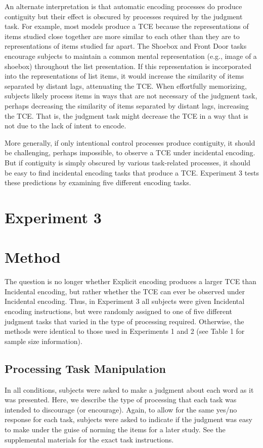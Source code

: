 \documentclass[man,natbib,floatsintext]{apa6} %
\begin{document}
An alternate interpretation is that automatic encoding processes do produce contiguity but their effect is obscured by processes required by the judgment task. For example, most models produce a TCE because the representations of items studied close together are more similar to each other than they are to representations of items studied far apart. The Shoebox and Front Door tasks encourage subjects to maintain a common mental representation (e.g., image of a shoebox) throughout the list presentation. If this representation is incorporated into the representations of list items, it would increase the similarity of items separated by distant lags, attenuating the TCE. When effortfully memorizing, subjects likely process items in ways that are not necessary of the judgment task, perhaps decreasing the similarity of items separated by distant lags, increasing the TCE. That is, the judgment task might decrease the TCE in a way that is not due to the lack of intent to encode.

More generally, if only intentional control processes produce contiguity, it should be challenging, perhaps impossible, to observe a TCE under incidental encoding. But if contiguity is simply obscured by various task-related processes, it should be easy to find incidental encoding tasks that produce a TCE. Experiment 3 tests these predictions by examining five different encoding tasks.

\section{Experiment 3}
\section{Method}
The question is no longer whether Explicit encoding produces a larger TCE than Incidental encoding, but rather whether the TCE can ever be observed under Incidental encoding. Thus, in Experiment 3 all subjects were given Incidental encoding instructions, but were randomly assigned to one of five different judgment tasks that varied in the type of processing required. Otherwise, the methods were identical to those used in Experiments 1 and 2 (see Table 1 for sample size information).

\subsection{Processing Task Manipulation}
In all conditions, subjects were asked to make a judgment about each word as it was presented. Here, we describe the type of processing that each task was intended to discourage (or encourage). Again, to allow for the same yes/no response for each task, subjects were asked to indicate if the judgment was easy to make under the guise of norming the items for a later study. See the supplemental materials for the exact task instructions.
\end{document}
